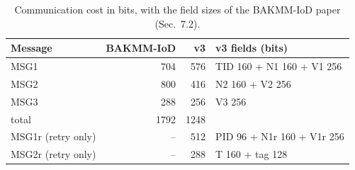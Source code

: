 \begin{table}[!t]
\centering
\footnotesize
\caption{Communication cost in bits, with the field sizes of the BAKMM-IoD paper (Sec.~7.2).}
\label{tab:comm}
\setlength{\tabcolsep}{3pt}
\begin{tabular}{lrrp{4.3cm}}
\toprule
Message & BAKMM-IoD & v3 & v3 fields (bits) \\
\midrule
MSG1 & 704 & 576 & TID 160 + N1 160 + V1 256 \\
MSG2 & 800 & 416 & N2 160 + V2 256 \\
MSG3 & 288 & 256 & V3 256 \\
total & 1792 & 1248 &  \\
MSG1r (retry only) & -- & 512 & PID 96 + N1r 160 + V1r 256 \\
MSG2r (retry only) & -- & 288 & T 160 + tag 128 \\
\bottomrule
\end{tabular}
\end{table}
